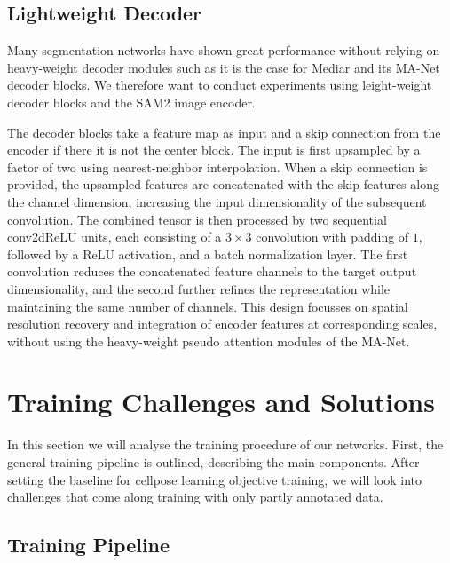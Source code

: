 \subsection{Lightweight Decoder}

Many segmentation networks \cite{Segformer, CellposeSAM} have shown great performance without relying on heavy-weight decoder modules such as it is the case for Mediar and its MA-Net decoder blocks. We therefore want to conduct experiments using leight-weight decoder blocks and the SAM2 image encoder. 

The decoder blocks take a feature map as input and a skip connection from the encoder if there it is not the center block. The input is first upsampled by a factor of two using nearest-neighbor interpolation. When a skip connection is provided, the upsampled features are concatenated with the skip features along the channel dimension, increasing the input dimensionality of the subsequent convolution. The combined tensor is then processed by two sequential conv2dReLU units, each consisting of a $3 \times 3$ convolution with padding of $1$, followed by a ReLU activation, and a batch normalization layer. The first convolution reduces the concatenated feature channels to the target output dimensionality, and the second further refines the representation while maintaining the same number of channels. This design focusses on spatial resolution recovery and integration of encoder features at corresponding scales, without using the heavy-weight pseudo attention modules of the MA-Net. 




\section{Training Challenges and Solutions}

In this section we will analyse the training procedure of our networks. First, the general training pipeline is outlined, describing the main components. After setting the baseline for cellpose learning objective training, we will look into challenges that come along training with only partly annotated data. 

\subsection{Training Pipeline}

